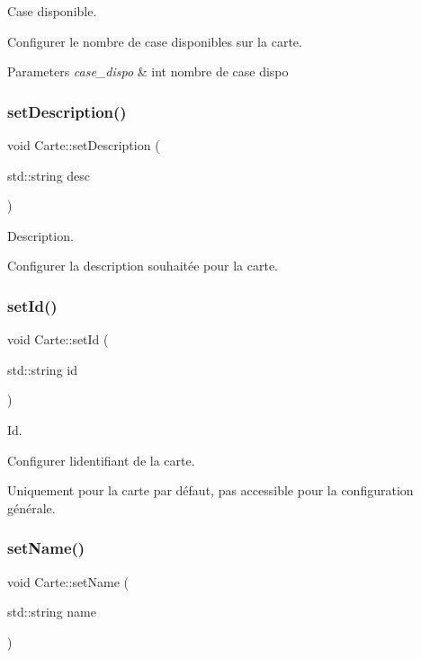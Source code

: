 Case disponible. 

Configurer le nombre de case disponibles sur la carte.


\begin{DoxyParams}{Parameters}
{\em case\+\_\+dispo} & int nombre de case dispo \\
\hline
\end{DoxyParams}
\mbox{\label{class_carte_afda8b2f0e96175d97c42afe87f535e15}} 
\subsubsection{\texorpdfstring{set\+Description()}{setDescription()}}
{\footnotesize\ttfamily void Carte\+::set\+Description (\begin{DoxyParamCaption}\item[{std\+::string}]{desc }\end{DoxyParamCaption})}



Description. 

Configurer la description souhaitée pour la carte. \mbox{\label{class_carte_a520750b429525b72885c3853727e8902}} 
\subsubsection{\texorpdfstring{set\+Id()}{setId()}}
{\footnotesize\ttfamily void Carte\+::set\+Id (\begin{DoxyParamCaption}\item[{std\+::string}]{id }\end{DoxyParamCaption})}



Id. 

Configurer l\textquotesingle{}identifiant de la carte.

Uniquement pour la carte par défaut, pas accessible pour la configuration générale. \mbox{\label{class_carte_a1d79dbe6ded5abd1e3f1a3192af0720e}} 
\subsubsection{\texorpdfstring{set\+Name()}{setName()}}
{\footnotesize\ttfamily void Carte\+::set\+Name (\begin{DoxyParamCaption}\item[{std\+::string}]{name }\end{DoxyParamCaption})}



